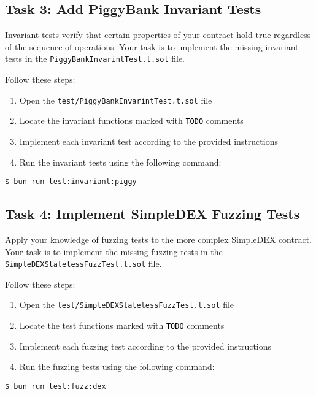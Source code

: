 \documentclass[12pt]{article}
\newcommand{\codegrey}[1]{%
  \texttt{\colorbox{black!4}{\textcolor{black}{#1}}}%
}
\begin{document}
\subsection*{Task 3: Add PiggyBank Invariant Tests}

Invariant tests verify that certain properties of your contract hold true regardless of the sequence of operations. Your task is to implement the missing invariant tests in the \texttt{PiggyBankInvarintTest.t.sol} file.

Follow these steps:
\begin{enumerate}
    \item Open the \texttt{test/PiggyBankInvarintTest.t.sol} file
    \item Locate the invariant functions marked with \codegrey{TODO} comments
    \item Implement each invariant test according to the provided instructions
    \item Run the invariant tests using the following command:
\end{enumerate}

\noindent \begin{minipage}{\textwidth}
\begin{verbatim}
$ bun run test:invariant:piggy
\end{verbatim}
\end{minipage}


\subsection*{Task 4: Implement SimpleDEX Fuzzing Tests}

Apply your knowledge of fuzzing tests to the more complex SimpleDEX contract. Your task is to implement the missing fuzzing tests in the \texttt{SimpleDEXStatelessFuzzTest.t.sol} file.

Follow these steps:
\begin{enumerate}
    \item Open the \texttt{test/SimpleDEXStatelessFuzzTest.t.sol} file
    \item Locate the test functions marked with \codegrey{TODO} comments
    \item Implement each fuzzing test according to the provided instructions
    \item Run the fuzzing tests using the following command:
\end{enumerate}

\noindent \begin{minipage}{\textwidth}
\begin{verbatim}
$ bun run test:fuzz:dex
\end{verbatim}
\end{minipage}
\end{document}
